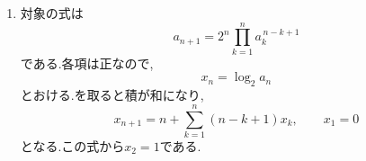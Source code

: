 \begin{enumerate}[label=\textbf{問\arabic*.},leftmargin=3.8em,format=\bookitemlink{practice-advanced}{solution}{problem}]
                ここで
                \[
                  b_n=\frac{1}{a_n-1}
                \]
                とおくと,
                \[
                  b_{n+1}=2b_n+n,\qquad b_1=1.
                \]
                逆数を取ると分数型は消えるが,まだ等比型ではない.右辺の$n$を消すため,
                \[
                  c_n=b_n+n+1
                \]
                とおけば,
                \begin{align*}
                  c_{n+1}
                    &=2b_n+n+(n+1)+1\\
                    &=2(b_n+n+1)=2c_n.
                \end{align*}
                $c_1=3$だから$c_n=3\cdot2^{n-1}$であり,
                \[
                  b_n=3\cdot2^{n-1}-n-1.
                \]
                逆数を戻してを得る.なお,\, $b_1=1$で,\, $b_{n+1}=2b_n+n>0$なので,得られた式の分母も$0$にならない.

                この問題では,への移動,逆数化,一次式の移動を別々の目的で使っている.一度の変換で解ける形にならなくても,次に消すべき項を見極めればよい.

                \noindent \textbf{【別解】}\\
                $b_n$の式を$2^n$で割ると,
                \[
                 \frac{b_{n+1}}{2^n}
                  -\frac{b_n}{2^{n-1}}=\frac{n}{2^n}.
                \]
                したがって
                \[
                 \frac{b_n}{2^{n-1}}
                 =1+\sum_{k=1}^{n-1}\frac{k}{2^k}.
                \]
                ここで
                \[
                 \frac{k}{2^k}
                 =\frac{k+1}{2^{k-1}}-\frac{k+2}{2^k}
                \]
                だから総和は相殺し,
                \[
                 \sum_{k=1}^{n-1}\frac{k}{2^k}
                  =2-\frac{n+1}{2^{n-1}}.
                \]
                これから同じ$b_n$を得る.一次式を加える解法は,この相殺をの形で先に組み込んだものといえる.
          \item 対象の式は
                \[
                  a_{n+1}=2^n\prod_{k=1}^{n}a_k^{\,n-k+1}
                \]
                である.各項は正なので,
                \[
                  x_n=\log_2a_n
                \]
                とおける.を取ると積が和になり,
                \[
                  x_{n+1}
                   =n+\sum_{k=1}^{n}(n-k+1)x_k,
                  \qquad x_1=0
                \]
                となる.この式から$x_2=1$である.


\end{enumerate}
